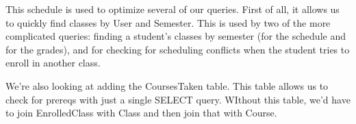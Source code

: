 \documentclass[11pt,oneside,a4paper]{article}
\begin{document}
This schedule is used to optimize several of our queries. First of all, it
allows us to quickly find classes by User and Semester. This is used by two of
the more complicated queries: finding a student's classes by semester (for the
schedule and for the grades), and for checking for scheduling conflicts when
the student tries to enroll in another class.

We're also looking at adding the CoursesTaken table. This table allows us to
check for prereqs with just a single SELECT query. WIthout this table, we'd
have to join EnrolledClass with Class and then join that with Course.
\end{document}
